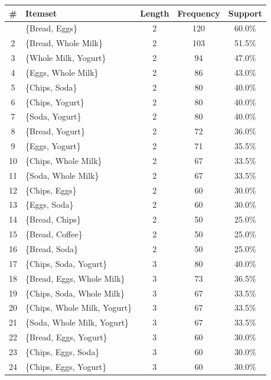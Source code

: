\documentclass[12pt,letterpaper, onecolumn]{exam}
\begin{document}
\begin{questions}
\begin{solution}
        {\small
        \begin{longtable}{|c|l|c|c|c|}
            \hline \# & Itemset & Length & Frequency & Support \\ \hline
            \endhead
            \hline
            \endfoot
            1 & \{Bread, Eggs\} & 2 & 120 & 60.0\% \\
            2 & \{Bread, Whole Milk\} & 2 & 103 & 51.5\% \\
            3 & \{Whole Milk, Yogurt\} & 2 & 94 & 47.0\% \\
            4 & \{Eggs, Whole Milk\} & 2 & 86 & 43.0\% \\
            5 & \{Chips, Soda\} & 2 & 80 & 40.0\% \\
            6 & \{Chips, Yogurt\} & 2 & 80 & 40.0\% \\
            7 & \{Soda, Yogurt\} & 2 & 80 & 40.0\% \\
            8 & \{Bread, Yogurt\} & 2 & 72 & 36.0\% \\
            9 & \{Eggs, Yogurt\} & 2 & 71 & 35.5\% \\
            10 & \{Chips, Whole Milk\} & 2 & 67 & 33.5\% \\
            11 & \{Soda, Whole Milk\} & 2 & 67 & 33.5\% \\
            12 & \{Chips, Eggs\} & 2 & 60 & 30.0\% \\
            13 & \{Eggs, Soda\} & 2 & 60 & 30.0\% \\
            14 & \{Bread, Chips\} & 2 & 50 & 25.0\% \\
            15 & \{Bread, Coffee\} & 2 & 50 & 25.0\% \\
            16 & \{Bread, Soda\} & 2 & 50 & 25.0\% \\
            17 & \{Chips, Soda, Yogurt\} & 3 & 80 & 40.0\% \\
            18 & \{Bread, Eggs, Whole Milk\} & 3 & 73 & 36.5\% \\
            19 & \{Chips, Soda, Whole Milk\} & 3 & 67 & 33.5\% \\
            20 & \{Chips, Whole Milk, Yogurt\} & 3 & 67 & 33.5\% \\
            21 & \{Soda, Whole Milk, Yogurt\} & 3 & 67 & 33.5\% \\
            22 & \{Bread, Eggs, Yogurt\} & 3 & 60 & 30.0\% \\
            23 & \{Chips, Eggs, Soda\} & 3 & 60 & 30.0\% \\
            24 & \{Chips, Eggs, Yogurt\} & 3 & 60 & 30.0\% \\

\end{longtable}}
\end{solution}
\end{questions}
\end{document}
